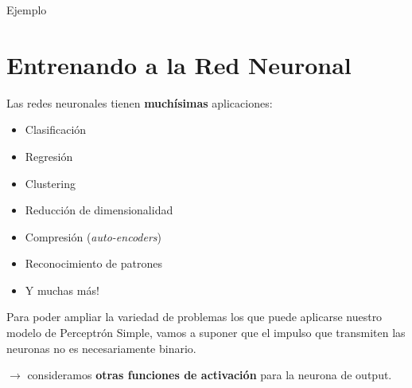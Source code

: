 \documentclass[aspectratio=169, usenames,dvipsnames]{beamer}
\begin{document}
\begin{frame}
    \centering
    Ejemplo
    
\end{frame}

\section{Entrenando a la Red Neuronal}

\begin{frame}
    Las redes neuronales tienen \textbf{muchísimas} aplicaciones:
    \begin{itemize}
        \item<1-> Clasificación
        \item<2-> Regresión
        \item<3-> Clustering
        \item<4-> Reducción de dimensionalidad
        \item<5-> Compresión (\textit{auto-encoders})
        \item<6-> Reconocimiento de patrones
        \item<7-> Y muchas más!
    \end{itemize}

\end{frame}

\begin{frame}
    Para poder ampliar la variedad de problemas los que puede aplicarse nuestro modelo de Perceptrón Simple, vamos a suponer que el impulso que transmiten las neuronas no es necesariamente binario.

    \vspace{1cm}
    \pause
    $\rightarrow$ consideramos \textbf{otras funciones de activación} para la neurona de output.
\end{frame}
\end{document}

